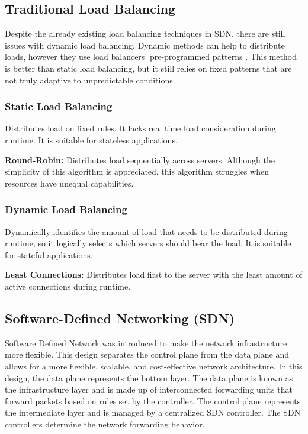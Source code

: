 \documentclass[conference]{IEEEtran}
\begin{document}
\subsection*{Traditional Load Balancing}

Despite the already existing load balancing techniques in SDN, there are still issues with dynamic load balancing. Dynamic methods can help to distribute loads, however they use load balancers’ pre-programmed patterns \cite{Alhilali_Montazerolghaem_2023}. This method is better than static load balancing, but it still relies on fixed patterns that are not truly adaptive to unpredictable conditions.

\subsubsection*{Static Load Balancing}
Distributes load on fixed rules. It lacks real time load consideration during runtime. It is suitable for stateless applications.

\textbf{Round-Robin:} Distributes load sequentially across servers. Although the simplicity of this algorithm is appreciated, this algorithm struggles when resources have unequal capabilities.

\subsubsection*{Dynamic Load Balancing}

Dynamically identifies the amount of load that needs to be distributed during runtime, so it logically selects which servers should bear the load. It is suitable for stateful applications.

\textbf{Least Connections:} Distributes load first to the server with the least amount of active connections during runtime.

\subsection*{Software-Defined Networking (SDN)}
Software Defined Network was introduced to make the network infrastructure more flexible. This design separates the control plane from the data plane and allows for a more flexible, scalable, and cost-effective network architecture\cite{Latah_Toker_2019}. In this design, the data plane represents the bottom layer. The data plane is known as the infrastructure layer and is made up of interconnected forwarding units that forward packets based on rules set by the controller. The control plane represents the intermediate layer and is managed by a centralized SDN controller. The SDN controllers determine the network forwarding behavior.
\end{document}
